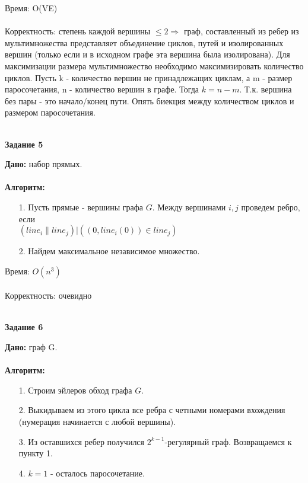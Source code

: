 \documentclass[12pt]{article} %
\begin{document}
	Время: O(VE)\\
	\\
	Корректность: степень каждой вершины $\le 2 \Rightarrow$ граф, составленный из ребер из мультимножества представляет 
				  объединение циклов, путей и изолированных вершин (только если и в исходном графе эта вершина была изолирована). Для максимизации размера мультимножество необходимо максимизировать количество циклов. Пусть k - количество вершин не принадлежащих циклам, а m - размер паросочетания, n - количество вершин в графе. Тогда $k = n - m$. Т.к. вершина без пары - это начало/конец пути. Опять биекция между количеством циклов и размером паросочетания.\\
	\\
	\begin{center}
		\textbf{Задание 5}\\
	\end{center}
	\textbf{Дано:} набор прямых.\\
	\\
	\textbf{Алгоритм:}\\
	\begin{enumerate}
		\item[1.] Пусть прямые - вершины графа $G$. Между вершинами $i, j$ проведем ребро, если\\
		 $(line_i \parallel line_j) | ((0, line_i(0)) \in line_j)$
		\item[2.] Найдем максимальное независимое множество.
	\end{enumerate}
	Время: $O(n^3)$\\
	\\
	Корректность: очевидно\\
	\\
	\begin{center}
		\textbf{Задание 6}\\
	\end{center}
	\textbf{Дано:} граф G.\\
	\\
	\textbf{Алгоритм:}\\
	\begin{enumerate}
		\item[1.] Строим эйлеров обход графа $G$.
		\item[2.] Выкидываем из этого цикла все ребра с четными номерами вхождения (нумерация начинается с любой 	
			      вершины).
		\item[3.] Из оставшихся ребер получился $2^{k - 1}$-регулярный граф. Возвращаемся к пункту 1.
		\item[4.] $k = 1$ - осталось паросочетание.  
	\end{enumerate}
\end{document}
